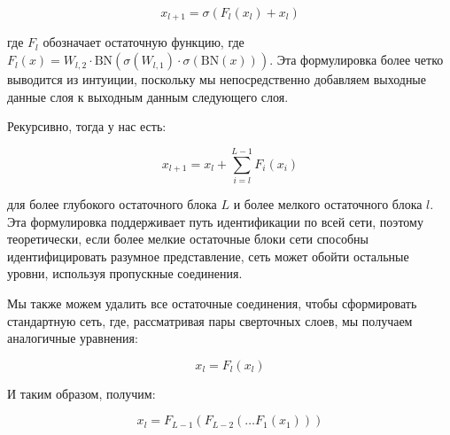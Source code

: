 \[
    x_{l + 1} = \sigma(F_{l}(x_{l}) + x_{l})
\]

где \(F_{l}\) обозначает остаточную функцию, где \(F_{l}(x) = W_{l,2} \cdot \text{BN}(\sigma(W_{l,1}) \cdot \sigma(\text{BN}(x)))\). Эта формулировка более четко выводится из интуиции, поскольку мы непосредственно добавляем выходные данные слоя к выходным данным следующего слоя.

Рекурсивно, тогда у нас есть:

\[
    x_{l + 1} = x_{l} + \sum_{i = l}^{L - 1} F_{i}(x_{i})
\]

для более глубокого остаточного блока \(L\) и более мелкого остаточного блока \(l\). Эта формулировка поддерживает путь идентификации по всей сети, поэтому теоретически, если более мелкие остаточные блоки сети способны идентифицировать разумное представление, сеть может обойти остальные уровни, используя пропускные соединения.

Мы также можем удалить все остаточные соединения, чтобы сформировать стандартную сеть, где, рассматривая пары сверточных слоев, мы получаем аналогичные уравнения:

\[
    x_{l} = F_{l}(x_{l})
\]

И таким образом, получим:

\[
    x_{l} = F_{L - 1}(F_{L - 2}(\ldots F_{1}(x_{1})))
\]